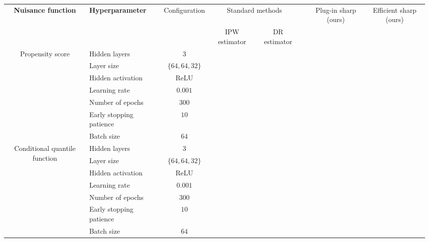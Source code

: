 \documentclass{article} %
\theoremstyle{plain}
\theoremstyle{definition}
\theoremstyle{remark}
\newcommand{\cmark}{\textcolor{ForestGreen}{\ding{51}}}
\newcommand{\xmark}{\textcolor{BrickRed}{\ding{55}}}
\begin{document}
\begin{table}[h!]
    \centering
    \begin{adjustbox}{max width=\textwidth}
    \begin{tabular}{c|l|c|c|c|c|c|c} %
        \toprule
        \textbf{Nuisance function} & \textbf{Hyperparameter} 
        & Configuration & \multicolumn{2}{c|}{Standard methods} & \citet{Kallus.2018c,Kallus.2021d}
        & Plug-in sharp (ours) & Efficient sharp (ours) \\ %
        \cmidrule(lr){4-5}
        & & & IPW estimator
        & DR estimator & & \\
        \midrule
    
    \multirow{7}{*}{Propensity score} & Hidden layers 
        & 3  &  &  & 
        &  &  \\ %
    & Layer size
        & $\{64, 64, 32\}$ & & & & & \\ %
    & Hidden activation
        & ReLU &   &   &  &   &  \\ %
    & Learning rate 
        & $0.001$ & \cmark & \cmark & \cmark & \xmark & \cmark \\ %
    & Number of epochs
        & $300$ &   &   &  &   &  \\ %
    & Early stopping patience
        & $10$ &   &   &  &   &  \\ %
    & Batch size
        & $64$ &   &   &  &   &  \\ %
        \midrule

        
    \multirow{7}{*}{Conditional quantile function} & Hidden layers 
        & 3  &  &  & 
        &  &  \\ %
    & Layer size
        & $\{64,64, 32\}$ & & & & & \\ %
    & Hidden activation
        & ReLU &   &   &  &   &  \\ %
    & Learning rate 
        & $0.001$ & \xmark & \xmark & \xmark & \xmark & \cmark \\ %
    & Number of epochs
        & $300$ &   &   &  &   &  \\ %
    & Early stopping patience
        & $10$ &   &   &  &   &  \\ %
    & Batch size
        & $64$ &   &   &  &   &  \\ %
        \midrule


\end{tabular}
\end{adjustbox}
\end{table}
\end{document}
